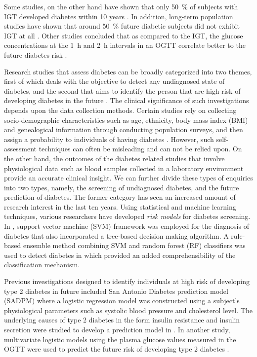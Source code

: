 \documentclass[journal,comsoc]{IEEEtran}
\renewcommand{\^}{\hat}  %
\begin{document}
Some studies, on the other hand have shown that only \SI{50}{\percent} of subjects with IGT developed diabetes within \num{10} years \cite{shaw_impaired_1999, writing_committee_impaired_2002}. In addition, long-term population studies have shown that around \SI{50}{\percent} future diabetic subjects did not exhibit IGT at all \cite{abdul-ghani_what_2007}. Other studies concluded that as compared to the IGT, the glucose concentrations at the \SI{1}{\hour} and \SI{2}{\hour} intervals in an OGTT correlate better to the future diabetes risk \cite{abdul2009fasting,abdul-ghani_shape_2010,abdul-ghani_plasma_2009}.

Research studies that assess diabetes can be broadly categorized into two themes, first of which deals with the objective to detect any undiagnosed state of diabetes, and the second that aims to identify the person that are high risk of developing diabetes in the future \cite{noble2011risk}. The clinical significance of such investigations depends upon the data collection methods. Certain studies rely on collecting socio-demographic characteristics such as age, ethnicity, body mass index (BMI) and genealogical information through conducting population surveys, and then assign a probability to individuals of having diabetes \cite{Heikes1040,Glumer727}.  However, such self-assessment techniques can often be misleading and can not be relied upon. On the other hand, the outcomes of the diabetes related studies that involve physiological data such as blood samples collected in a laboratory environment provide an accurate clinical insight. We can further divide these types of enquiries into two types, namely, the screening  of undiagnosed diabetes, and the future prediction of diabetes. The former category has seen an increased amount of research interest in the last ten years. Using statistical and machine learning techniques, various researchers have developed \emph{risk models} for diabetes screening. In \cite{barakat_intelligible_2010}, support vector machine (SVM) framework was employed for the diagnosis of diabetes that also incorporated a tree-based decision making algorithm. A rule-based ensemble method combining SVM and random forest (RF) classifiers was used to detect diabetes in \cite{han_rule_2015} which provided an added comprehensibility of the classification mechanism.

Previous investigations designed to identify individuals at high risk of developing type 2 diabetes in future included San Antonio Diabetes prediction model (SADPM) \cite{stern2002identification} where a logistic regression model was constructed using a subject's physiological parameters such as systolic blood pressure and cholesterol level. The underlying causes of type 2 diabetes in the form insulin resistance and insulin secretion were studied to develop a prediction model in \cite{abdul-ghani_what_2007}. In another study,  multivariate logistic models using the plasma glucose values measured in the OGTT were used to predict the future risk of developing type 2 diabetes \cite{abdul-ghani_two-step_2011,abdul2009fasting}.
\end{document}
